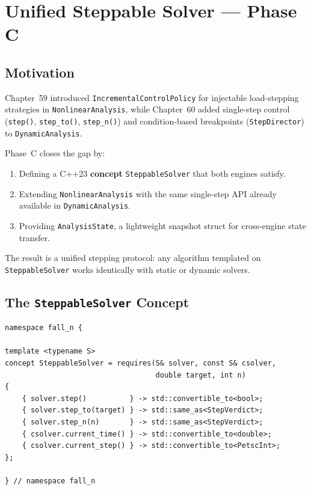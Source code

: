 \chapter{Unified Steppable Solver — Phase C}
\label{ch:steppable_solver_concept}


\section{Motivation}

Chapter~59 introduced \texttt{IncrementalControlPolicy} for injectable
load-stepping strategies in \texttt{NonlinearAnalysis}, while Chapter~60
added single-step control (\texttt{step()}, \texttt{step\_to()},
\texttt{step\_n()}) and condition-based breakpoints (\texttt{StepDirector})
to \texttt{DynamicAnalysis}.

Phase~C closes the gap by:
\begin{enumerate}
  \item Defining a C++23 \textbf{concept} \texttt{SteppableSolver} that
        both engines satisfy.
  \item Extending \texttt{NonlinearAnalysis} with the same single-step
        API already available in \texttt{DynamicAnalysis}.
  \item Providing \texttt{AnalysisState}, a lightweight snapshot struct
        for cross-engine state transfer.
\end{enumerate}

The result is a unified stepping protocol: any algorithm templated on
\texttt{SteppableSolver} works identically with static or dynamic solvers.


\section{The \texttt{SteppableSolver} Concept}

\begin{verbatim}
namespace fall_n {

template <typename S>
concept SteppableSolver = requires(S& solver, const S& csolver,
                                   double target, int n)
{
    { solver.step()          } -> std::convertible_to<bool>;
    { solver.step_to(target) } -> std::same_as<StepVerdict>;
    { solver.step_n(n)       } -> std::same_as<StepVerdict>;
    { csolver.current_time() } -> std::convertible_to<double>;
    { csolver.current_step() } -> std::convertible_to<PetscInt>;
};

} // namespace fall_n
\end{verbatim}

